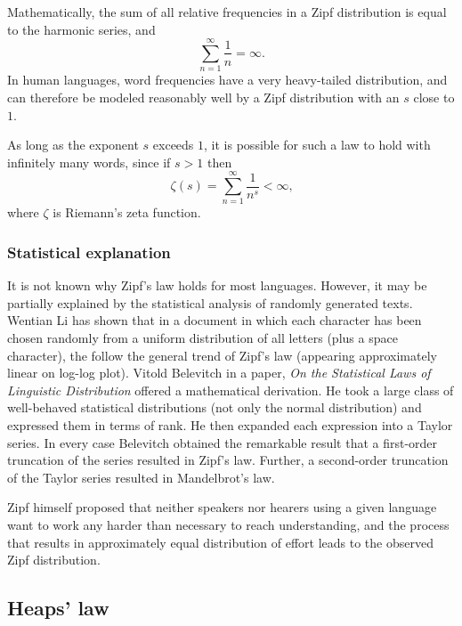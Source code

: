       Mathematically, the sum of all relative frequencies in a Zipf distribution is equal to the harmonic series, and
      \begin{equation}
        \sum_{n=1}^\infty \frac{1}{n}=\infty\mbox{.}
      \end{equation}
      In human languages, word frequencies have a very heavy-tailed distribution, and can therefore be modeled reasonably well by a Zipf distribution with an $s$ close to $1$.

      As long as the exponent $s$ exceeds $1$, it is possible for such a law to hold with infinitely many words, since if $s > 1$ then
      \begin{equation}
        \zeta (s) = \sum_{n=1}^\infty \frac{1}{n^s}<\infty\mbox{,}
      \end{equation}
      where $\zeta$ is Riemann's zeta function.

    \subsubsection{Statistical explanation}
      
      It is not known why Zipf's law holds for most languages.\cite{Brillouin2004} However, it may be partially explained by the statistical analysis of randomly generated texts. Wentian Li has shown that in a document in which each character has been chosen randomly from a uniform distribution of all letters (plus a space character), the  follow the general trend of Zipf's law (appearing approximately linear on log-log plot).\cite{WentianLi1992} Vitold Belevitch in a paper, \emph{On the Statistical Laws of Linguistic Distribution} offered a mathematical derivation. He took a large class of well-behaved statistical distributions (not only the normal distribution) and expressed them in terms of rank. He then expanded each expression into a Taylor series. In every case Belevitch obtained the remarkable result that a first-order truncation of the series resulted in Zipf's law. Further, a second-order truncation of the Taylor series resulted in Mandelbrot's law.\cite{Neumann2013,Belevitch1959}

      Zipf himself proposed that neither speakers nor hearers using a given language want to work any harder than necessary to reach understanding, and the process that results in approximately equal distribution of effort leads to the observed Zipf distribution.\cite{Zipf1949,CanchoSole2003}
  
  \subsection{Heaps' law}
  
